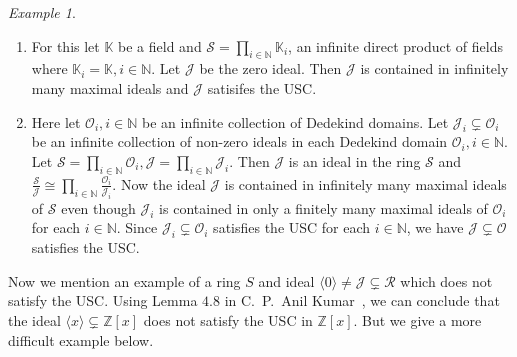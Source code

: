 \documentclass[12pt]{amsart}
\newcommand{\sbnq}{\subsetneq}
\newcommand{\mbb}{\mathbb}
\newcommand{\mcl}{\mathcal}
\newcommand{\us}{\underset}
\newcommand{\N}{\mbb N}
\newcommand{\Z}{\mbb Z}
\newcommand{\R}{\mcl R}
\theoremstyle{plain}
\theoremstyle{definition}
\theoremstyle{remark}
\newtheorem{example}[theorem]{Example}
\numberwithin{equation}{section}
\begin{document}
\begin{example}
	\label{Example:USC}
	~\\
		\begin{enumerate}[label=(\roman*)]
			\item 
			For this let $\mathbb{K}$ be a field and $\mcl{S}=\us{i\in \N}{\prod} \mathbb{K}_i$, an infinite direct product of fields where $\mathbb{K}_i=\mathbb{K},i\in\N$. Let $\mcl{J}$ be the zero ideal. Then $\mcl{J}$ is contained in infinitely many maximal ideals and $\mcl{J}$ satisifes the USC.
			
			\item Here let $\mcl{O}_i,i\in \N$ be an infinite collection of Dedekind domains. Let $\mcl{J}_i\sbnq \mcl{O}_i$ be an infinite collection of non-zero ideals in each Dedekind domain $\mcl{O}_i,i\in \N$. Let $\mcl{S}=\us{i\in \N}{\prod}\mcl{O}_i,\mcl{J}=\us{i\in \N}{\prod}\mcl{J}_i$. Then $\mcl{J}$ is an ideal in the ring $\mcl{S}$ and $\frac{\mcl{S}}{\mcl{J}}\cong\us{i\in \N}{\prod} \frac{\mcl{O}_i}{\mcl{J}_i}$. Now the ideal $\mcl{J}$ is contained in infinitely many maximal ideals of $\mcl{S}$ even though $\mcl{J}_i$ is contained in only a finitely many maximal ideals of $\mcl{O}_i$ for each $i\in \N$. Since $\mcl{J}_i\sbnq \mcl{O}_i$ satisfies the USC for each $i\in \N$, we have $\mcl{J}\sbnq \mcl{O}$ satisfies the USC.	
	\end{enumerate}	
	
\end{example}
Now we mention an example of a ring $S$ and ideal $\langle 0\rangle \neq \mcl{J}\sbnq \R$ which does not satisfy the USC. Using Lemma $4.8$ in C.~P.~Anil Kumar~\cite{CPAKII}, we can conclude that the ideal $\langle x\rangle \sbnq \Z[x]$ does not satisfy the USC in $\Z[x]$. But we give a more difficult example below.
\end{document}
